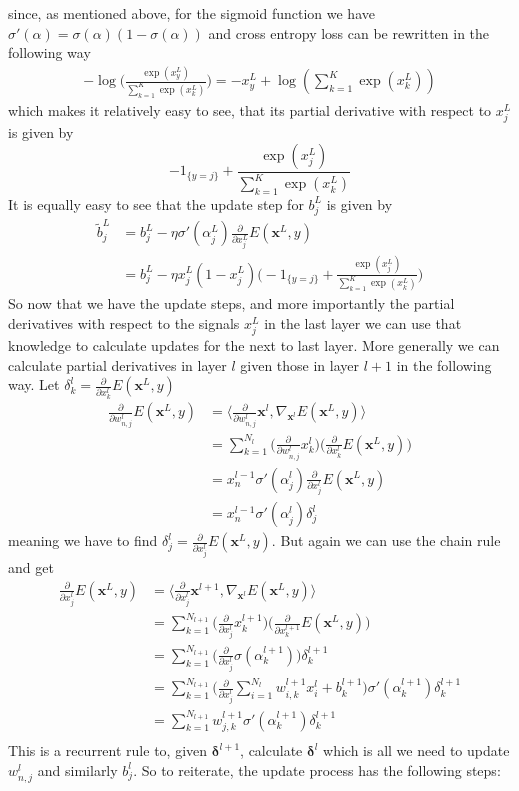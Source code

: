\documentclass[preprint,12pt,3p]{elsarticle}
\begin{document}
since, as mentioned above, for the sigmoid function we have $\sigma'(\alpha)=\sigma(\alpha)(1-\sigma(\alpha))$ and cross entropy loss can be rewritten in the following way
\begin{align*}
    -\log\Big(\frac{\exp(x^L_y)}{\sum_{k=1}^K\exp(x_k^L)}\Big)=-x^L_y+\log(\sum_{k=1}^K\exp(x_k^L))
\end{align*}
which makes it relatively easy to see, that its partial derivative with respect to $x^L_j$ is given by 
$$-1_{\{y=j\}}+\frac{\exp(x^L_j)}{\sum_{k=1}^K\exp(x_k^L)}$$
It is equally easy to see that the update step for $b_j^L$ is given by
\begin{align*}
    \tilde{b}^L_{j}&=b^L_{j}-\eta\sigma'(\alpha^L_j)\frac{\partial}{\partial x^L_j}E(\mathbf{x}^L,y)\\
    &=b^L_{j}-\eta x^L_j(1-x^L_j)\Big(-1_{\{y=j\}}+\frac{\exp(x^L_j)}{\sum_{k=1}^K\exp(x_k^L)}\Big)
\end{align*}
So now that we have the update steps, and more importantly the partial derivatives with respect to the signals $x_j^L$ in the last layer we can use that knowledge to calculate updates for the next to last layer. More generally we can calculate partial derivatives in layer $l$ given those in layer $l+1$ in the following way.
Let $\delta_k^{l}=\frac{\partial}{\partial x^{l}_k}E(\mathbf{x}^L,y)$
\begin{align*}
    \frac{\partial}{\partial w^l_{n,j}}E(\mathbf{x}^L,y)
    &=\langle\frac{\partial}{\partial w^l_{n,j}}\mathbf{x}^l,\nabla_{\mathbf{x}^l}E(\mathbf{x}^L,y) \rangle\\
    &=\sum_{k=1}^{N_l}\Big(\frac{\partial}{\partial w^l_{n,j}}x^l_k\Big)\Big(\frac{\partial}{\partial x^l_k}E(\mathbf{x}^L,y)\Big)\\
    &=x^{l-1}_n\sigma'(\alpha^l_j)\frac{\partial}{\partial x^l_j}E(\mathbf{x}^L,y)\\
    &=x^{l-1}_n\sigma'(\alpha^l_j)\delta_j^{l}
\end{align*}
meaning we have to find $\delta_j^{l}=\frac{\partial}{\partial x^l_j}E(\mathbf{x}^L,y)$. But again we can use the chain rule and get
\allowdisplaybreaks
\begin{align*}
    \frac{\partial}{\partial x^l_j}E(\mathbf{x}^L,y)&=\langle\frac{\partial}{\partial x^l_j}\mathbf{x}^{l+1},\nabla_{\mathbf{x}^l}E(\mathbf{x}^L,y) \rangle\\
    &=\sum_{k=1}^{N_{l+1}}\Big(\frac{\partial}{\partial x^l_j}x^{l+1}_k\Big)\Big(\frac{\partial}{\partial x^{l+1}_k}E(\mathbf{x}^L,y)\Big)\\
    &=\sum_{k=1}^{N_{l+1}}\Big(\frac{\partial}{\partial x^l_j}\sigma(\alpha_k^{l+1})\Big)\delta^{l+1}_k\\
    &=\sum_{k=1}^{N_{l+1}}\Big(\frac{\partial}{\partial x^l_j}\sum_{i=1}^{N_l}w_{i,k}^{l+1}x_i^l+b_k^{l+1}\Big)\sigma'(\alpha_k^{l+1})\delta^{l+1}_k\\
    &=\sum_{k=1}^{N_{l+1}}w_{j,k}^{l+1}\sigma'(\alpha_k^{l+1})\delta^{l+1}_k\\
\end{align*}
This is a recurrent rule to, given $\boldsymbol{\delta}^{l+1}$, calculate $\boldsymbol{\delta}^{l}$ which is all we need to update $w^l_{n,j}$ and similarly $b^l_{j}$. 
So to reiterate, the update process has the following steps:
\end{document}
